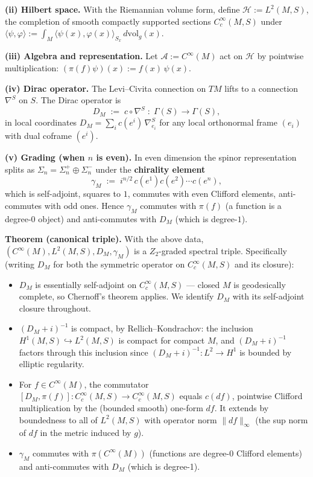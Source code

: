 \documentclass[
  11pt,
]{article}
\providecommand{\tightlist}{%
  \setlength{\itemsep}{0pt}\setlength{\parskip}{0pt}}
\begin{document}
\textbf{(ii) Hilbert space.} With the Riemannian volume form, define
\(\mathcal{H}:= L^2(M, S)\), the completion of smooth compactly
supported sections \(C_c^{\infty}(M, S)\) under
\(\langle \psi, \varphi\rangle := \int_M \langle \psi(x), \varphi(x)\rangle_{S_x}\,d\mathrm{vol}_g(x)\).

\textbf{(iii) Algebra and representation.} Let
\(\mathcal{A}:= C^{\infty}(M)\) act on \(\mathcal{H}\) by pointwise
multiplication: \((\pi(f)\psi)(x) := f(x)\,\psi(x)\).

\textbf{(iv) Dirac operator.} The Levi--Civita connection on \(TM\)
lifts to a connection \(\nabla^S\) on \(S\). The Dirac operator is \[
D_M \;:=\; c \circ \nabla^S
\;\colon\; \Gamma(S) \to \Gamma(S),
\] in local coordinates \(D_M = \sum_i c(e^i)\,\nabla^S_{e_i}\) for any
local orthonormal frame \((e_i)\) with dual coframe \((e^i)\).

\textbf{(v) Grading (when \(n\) is even).} In even dimension the spinor
representation splits as \(\Sigma_n = \Sigma_n^+ \oplus \Sigma_n^-\)
under the \textbf{chirality element} \[
\gamma_M \;:=\; i^{n/2}\, c(e^1) c(e^2) \cdots c(e^n),
\] which is self-adjoint, squares to \(1\), commutes with even Clifford
elements, anti-commutes with odd ones. Hence \(\gamma_M\) commutes with
\(\pi(f)\) (a function is a degree-\(0\) object) and anti-commutes with
\(D_M\) (which is degree-\(1\)).

\textbf{Theorem (canonical triple).} With the above data,
\((C^{\infty}(M), L^2(M,S), D_M, \gamma_M)\) is a \(Z_2\)-graded
spectral triple. Specifically (writing \(D_M\) for both the symmetric
operator on \(C_c^\infty(M, S)\) and its closure):

\begin{itemize}
\tightlist
\item
  \(D_M\) is essentially self-adjoint on \(C_c^{\infty}(M,S)\) ---
  closed \(M\) is geodesically complete, so Chernoff's theorem applies.
  We identify \(D_M\) with its self-adjoint closure throughout.
\item
  \((D_M + i)^{-1}\) is compact, by Rellich--Kondrachov: the inclusion
  \(H^1(M,S) \hookrightarrow L^2(M,S)\) is compact for compact \(M\),
  and \((D_M + i)^{-1}\) factors through this inclusion since
  \((D_M + i)^{-1}\colon L^2 \to H^1\) is bounded by elliptic
  regularity.
\item
  For \(f \in C^{\infty}(M)\), the commutator
  \([D_M, \pi(f)]\colon C_c^\infty(M, S) \to C_c^\infty(M, S)\) equals
  \(c(df)\), pointwise Clifford multiplication by the (bounded smooth)
  one-form \(df\). It extends by boundedness to all of \(L^2(M, S)\)
  with operator norm \(\|df\|_{\infty}\) (the sup norm of \(df\) in the
  metric induced by \(g\)).
\item
  \(\gamma_M\) commutes with \(\pi(C^{\infty}(M))\) (functions are
  degree-0 Clifford elements) and anti-commutes with \(D_M\) (which is
  degree-1).
\end{itemize}
\end{document}
